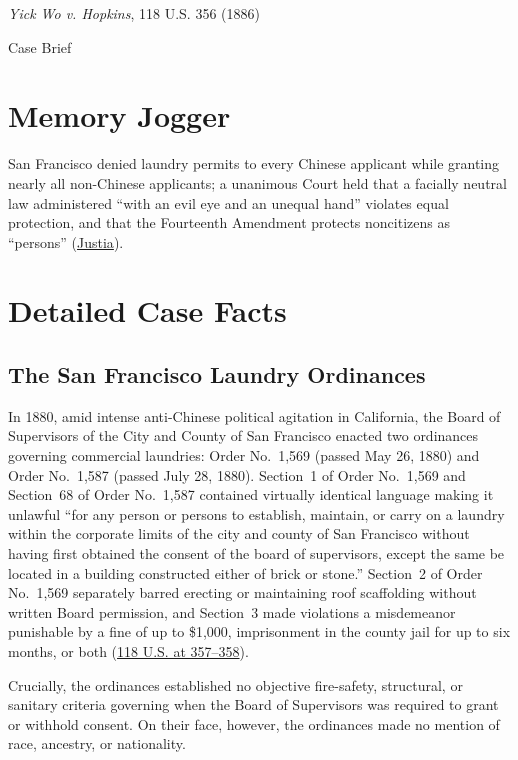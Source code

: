 \documentclass[12pt]{article}
\begin{document}
\begin{center}
{\LARGE \textit{Yick Wo v. Hopkins}, 118 U.S. 356 (1886)\par}
\vspace{0.8em}
{\large Case Brief\par}
\end{center}
\vspace{1em}

\section{Memory Jogger}
San Francisco denied laundry permits to every Chinese applicant while granting nearly all non-Chinese applicants; a unanimous Court held that a facially neutral law administered ``with an evil eye and an unequal hand'' violates equal protection, and that the Fourteenth Amendment protects noncitizens as ``persons'' (\href{https://supreme.justia.com/cases/federal/us/118/356/}{Justia}).

\section{Detailed Case Facts}
\subsection{The San Francisco Laundry Ordinances}
In 1880, amid intense anti-Chinese political agitation in California, the Board of Supervisors of the City and County of San Francisco enacted two ordinances governing commercial laundries: Order No.~1,569 (passed May 26, 1880) and Order No.~1,587 (passed July 28, 1880). Section~1 of Order No.~1,569 and Section~68 of Order No.~1,587 contained virtually identical language making it unlawful ``for any person or persons to establish, maintain, or carry on a laundry within the corporate limits of the city and county of San Francisco without having first obtained the consent of the board of supervisors, except the same be located in a building constructed either of brick or stone.'' Section~2 of Order No.~1,569 separately barred erecting or maintaining roof scaffolding without written Board permission, and Section~3 made violations a misdemeanor punishable by a fine of up to \$1,000, imprisonment in the county jail for up to six months, or both (\href{https://www.law.cornell.edu/supremecourt/text/118/356}{118 U.S. at 357--358}).

Crucially, the ordinances established no objective fire-safety, structural, or sanitary criteria governing when the Board of Supervisors was required to grant or withhold consent. On their face, however, the ordinances made no mention of race, ancestry, or nationality.
\end{document}
